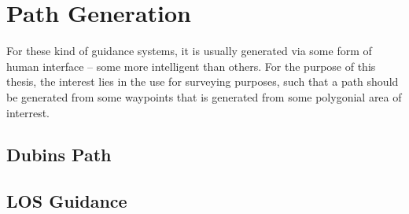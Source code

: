 \chapter{Path Generation}

For these kind of guidance systems, it is usually generated via some
form of human interface -- some more intelligent than others. For the
purpose of this thesis, the interest lies in the use for surveying
purposes, such that a path should be generated from some waypoints
that is generated from some polygonial area of interrest.

\section{Dubins Path}

\section{\acs{LOS} Guidance}

